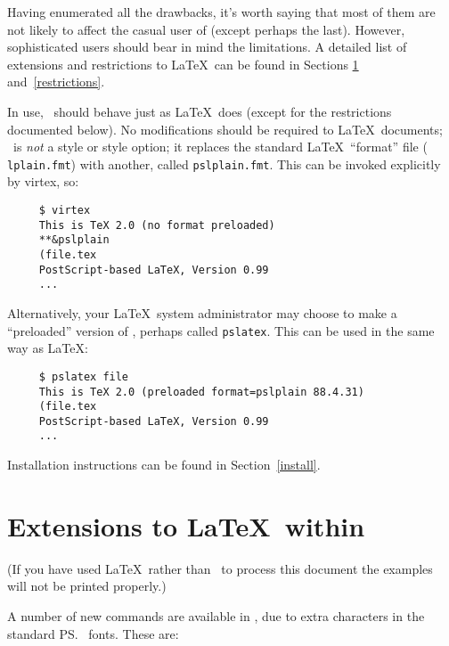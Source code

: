 Having enumerated all the drawbacks, it's worth saying that most of
them are not likely to affect the casual user of \pslatex (except
perhaps the last).  However, sophisticated users should bear in mind
the limitations.  A detailed list of extensions and restrictions to
\LaTeX\ can be found in Sections \ref{extensions}
and~\ref{restrictions}.

In use, \pslatex\ should behave just as \LaTeX\ does (except for the
restrictions documented below).  No modifications should be required
to \LaTeX\ documents; \pslatex\ is {\em not\/} a style or style
option; it replaces the standard \LaTeX\ ``format''  file ({\tt
lplain.fmt}) with another, called {\tt pslplain.fmt}.  This can
be invoked explicitly by {\sc virtex}, so:
\begin{verbatim}
     $ virtex
     This is TeX 2.0 (no format preloaded)
     **&pslplain 
     (file.tex
     PostScript-based LaTeX, Version 0.99
     ...
\end{verbatim}
Alternatively, your \LaTeX\ system administrator may choose to make a
``preloaded'' version of \pslatex, perhaps called {\tt pslatex}.  This
can be used in the same way as \LaTeX:
\begin{verbatim}
     $ pslatex file
     This is TeX 2.0 (preloaded format=pslplain 88.4.31)
     (file.tex
     PostScript-based LaTeX, Version 0.99
     ...
\end{verbatim}
Installation instructions can be found in Section~\ref{install}.

\section{Extensions to \LaTeX\ within \pslatex}\label{extensions}

(If you have used \LaTeX\ rather than \pslatex\ to process this
document the examples will not be printed properly.)

A number of new commands are available in \pslatex, due to extra
characters in the standard \ps\ fonts.  These are:

